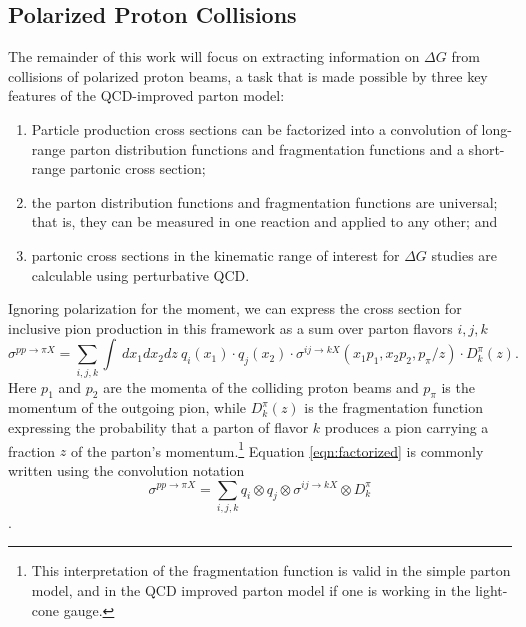 \subsection{Polarized Proton Collisions}


The remainder of this work will focus on extracting information on $\Delta G$ from collisions of polarized proton beams, a task that is made possible by three key features of the QCD-improved parton model:

\begin{enumerate}
  \item Particle production cross sections can be factorized into a convolution of long-range parton distribution functions and fragmentation functions and a short-range partonic cross section;
  \item the parton distribution functions and fragmentation functions are universal; that is, they can be measured in one reaction and applied to any other; and
  \item partonic cross sections in the kinematic range of interest for $\Delta G$ studies are calculable using perturbative QCD.
\end{enumerate}

Ignoring polarization for the moment, we can express the cross section for inclusive pion production in this framework as a sum over parton flavors $i,j,k$
%
\begin{equation}
  \sigma^{pp \rightarrow \pi X} = \sum_{i,j,k} \int~dx_1 dx_2 dz~ q_i(x_1) \cdot q_j(x_2) \cdot \sigma^{ij \rightarrow k X}(x_1 p_1,x_2 p_2, p_{\pi}/z) \cdot D_k^\pi(z).
  \label{eqn:factorized}
\end{equation}
%
Here $p_1$ and $p_2$ are the momenta of the colliding proton beams and $p_{\pi}$ is the momentum of the outgoing pion, while $D_k^{\pi}(z)$ is the fragmentation function expressing the probability that a parton of flavor $k$ produces a pion carrying a fraction $z$ of the parton's momentum.\footnote{This interpretation of the fragmentation function is valid in the simple parton model, and in the QCD improved parton model if one is working in the light-cone gauge.} Equation \ref{eqn:factorized} is commonly written using the convolution notation
%
\begin{equation}
  \sigma^{pp \rightarrow \pi X} = \sum_{i,j,k} q_i \otimes q_j \otimes \sigma^{ij \rightarrow kX} \otimes D_k^\pi
\end{equation}.


